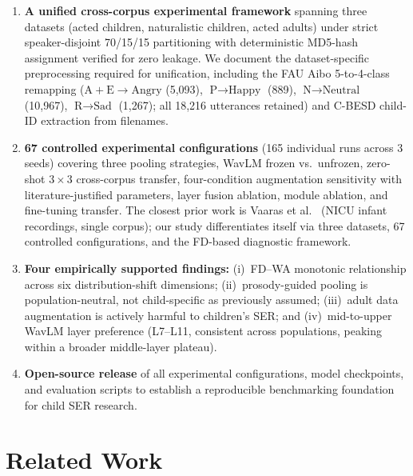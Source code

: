 \documentclass[11pt,a4paper]{article}
\begin{document}
\begin{enumerate}
\item \textbf{A unified cross-corpus experimental framework} spanning three
  datasets (acted children, naturalistic children, acted adults) under strict
  speaker-disjoint 70/15/15 partitioning with deterministic MD5-hash assignment
  verified for zero leakage. We document the dataset-specific preprocessing
  required for unification, including the FAU Aibo 5-to-4-class remapping
  ($\text{A}+\text{E} \rightarrow \text{Angry}$ (5,093),
  $\text{P} \rightarrow \text{Happy}$ (889),
  $\text{N} \rightarrow \text{Neutral}$ (10,967),
  $\text{R} \rightarrow \text{Sad}$ (1,267); all 18,216 utterances retained) and
  C-BESD child-ID extraction from filenames.

\item \textbf{67 controlled experimental configurations} (165 individual runs
  across 3 seeds) covering three pooling strategies, WavLM frozen vs.\
  unfrozen, zero-shot $3\times3$ cross-corpus transfer, four-condition
  augmentation sensitivity with literature-justified parameters, layer fusion
  ablation, module ablation, and fine-tuning transfer. The closest prior work
  is Vaaras et al.~\cite{vaaras2023speech} (NICU infant recordings, single
  corpus); our study differentiates itself via three datasets, 67 controlled
  configurations, and the FD-based diagnostic framework.

\item \textbf{Four empirically supported findings:} (i)~FD--WA monotonic
  relationship across six distribution-shift dimensions; (ii)~prosody-guided
  pooling is population-neutral, not child-specific as previously assumed;
  (iii)~adult data augmentation is actively harmful to children's SER; and
  (iv)~mid-to-upper WavLM layer preference (L7--L11, consistent across
  populations, peaking within a broader middle-layer plateau).

\item \textbf{Open-source release} of all experimental configurations, model
  checkpoints, and evaluation scripts to establish a reproducible benchmarking
  foundation for child SER research.
\end{enumerate}


\section{Related Work}
\label{sec:related_work}
\end{document}
